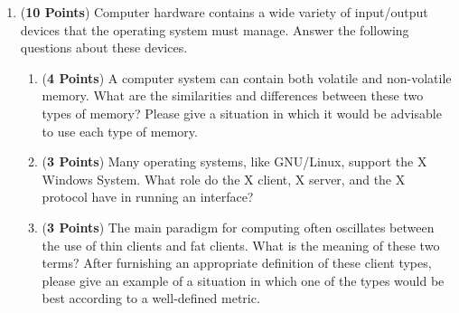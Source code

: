 \documentclass[12pt,epsf,psfig,graphics]{article}
\begin{document}
\begin{enumerate}
% 
% 
% 
% 
% 
% 

\item ({\bf 10 Points}) Computer hardware contains a wide variety of input/output devices that the operating system must
  manage.  Answer the following questions about these devices.

  \begin{enumerate}

    \item ({\bf 4 Points}) A computer system can contain both volatile and non-volatile memory.  What are the
      similarities and differences between these two types of memory?  Please give a situation in which it would be
      advisable to use each type of memory.

    \item ({\bf 3 Points}) Many operating systems, like GNU/Linux, support the X Windows System.  What role do the X
      client, X server, and the X protocol have in running an interface?

    \item ({\bf 3 Points}) The main paradigm for computing often oscillates between the use of thin clients and fat
      clients.  What is the meaning of these two terms?  After furnishing an appropriate definition of these client
      types, please give an example of a situation in which one of the types would be best according to a well-defined
      metric.


\end{enumerate}
\end{enumerate}
\end{document}
